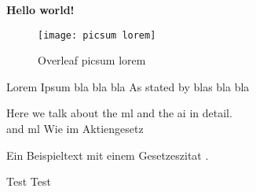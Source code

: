 \documentclass[../main.tex]{subfiles}
\begin{document}
\textbf{Hello world!}

\begin{figure}[bh]
\centering
\texttt{[image: picsum lorem]}

\label{fig:picsum lorem}
\caption{Overleaf picsum lorem}
\end{figure}

Lorem Ipsum bla\autocite[10]{moews_kosten-_2002} bla bla As stated by 
blas bla bla 

Here we talk about the \gls{ml} and the \gls{ai} in detail.\\ and \gls{ml}
Wie im Aktiengesetz 

Ein Beispieltext mit einem Gesetzeszitat .


Test Test \autocite[10]{deppermann_sprache_2018}
 
\end{document}
